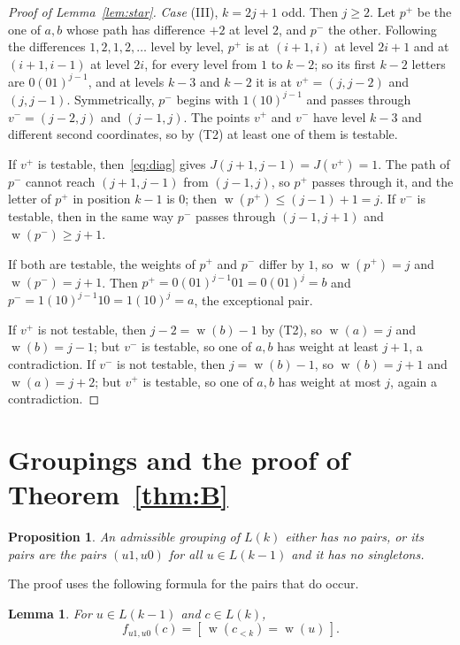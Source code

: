 \documentclass[11pt]{amsart}
\newtheorem{proposition}[theorem]{Proposition}
\newtheorem{lemma}[theorem]{Lemma}
\theoremstyle{definition}
\theoremstyle{remark}
\numberwithin{equation}{section}
\newcommand{\Iv}[1]{[\,#1\,]}
\DeclareMathOperator{\wt}{w}
\begin{document}
\begin{proof}[Proof of Lemma~\ref{lem:star}]
\emph{Case} (III), $k=2j+1$ odd. Then $j\ge2$. Let $p^+$ be the one of $a,b$ whose path has difference $+2$ at level $2$, and $p^-$ the other. Following the differences $1,2,1,2,\dots$ level by level, $p^+$ is at $(i+1,i)$ at level $2i+1$ and at $(i+1,i-1)$ at level $2i$, for every level from $1$ to $k-2$; so its first $k-2$ letters are $0(01)^{j-1}$, and at levels $k-3$ and $k-2$ it is at $v^+=(j,j-2)$ and $(j,j-1)$. Symmetrically, $p^-$ begins with $1(10)^{j-1}$ and passes through $v^-=(j-2,j)$ and $(j-1,j)$. The points $v^+$ and $v^-$ have level $k-3$ and different second coordinates, so by (T2) at least one of them is testable.

If $v^+$ is testable, then~\eqref{eq:diag} gives $J(j+1,j-1)=J(v^+)=1$. The path of $p^-$ cannot reach $(j+1,j-1)$ from $(j-1,j)$, so $p^+$ passes through it, and the letter of $p^+$ in position $k-1$ is $0$; then $\wt(p^+)\le (j-1)+1=j$. If $v^-$ is testable, then in the same way $p^-$ passes through $(j-1,j+1)$ and $\wt(p^-)\ge j+1$.

If both are testable, the weights of $p^+$ and $p^-$ differ by $1$, so $\wt(p^+)=j$ and $\wt(p^-)=j+1$. Then $p^+=0(01)^{j-1}01=0(01)^j=b$ and $p^-=1(10)^{j-1}10=1(10)^j=a$, the exceptional pair.

If $v^+$ is not testable, then $j-2=\wt(b)-1$ by (T2), so $\wt(a)=j$ and $\wt(b)=j-1$; but $v^-$ is testable, so one of $a,b$ has weight at least $j+1$, a contradiction. If $v^-$ is not testable, then $j=\wt(b)-1$, so $\wt(b)=j+1$ and $\wt(a)=j+2$; but $v^+$ is testable, so one of $a,b$ has weight at most $j$, again a contradiction.
\end{proof}

\section{Groupings and the proof of Theorem~\ref{thm:B}}\label{sec:groupings}

\begin{proposition}\label{prop:groupings}
An admissible grouping of $L(k)$ either has no pairs, or its pairs are the pairs $(u1,u0)$ for all $u\in L(k-1)$ and it has no singletons.
\end{proposition}

The proof uses the following formula for the pairs that do occur.

\begin{lemma}\label{lem:canonical}
For $u\in L(k-1)$ and $c\in L(k)$,
\[
f_{u1,u0}(c)=\Iv{\wt(c_{<k})=\wt(u)} .
\]
\end{lemma}
\end{document}
